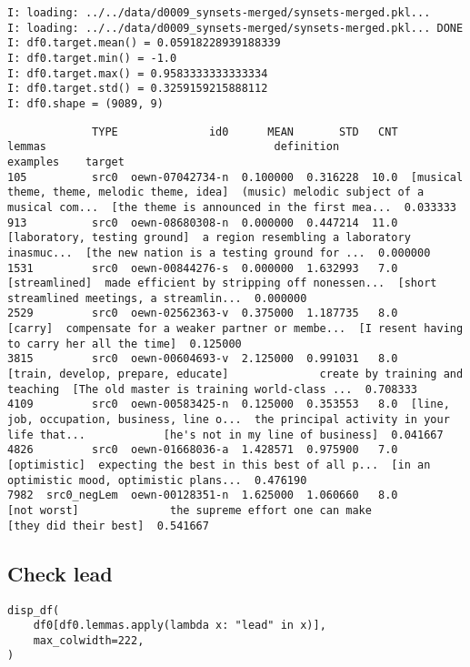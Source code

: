 \documentclass[a4paper,10pt,onecolumn,oneside,openright]{article}
\begin{document}
\begin{verbatim}
I: loading: ../../data/d0009_synsets-merged/synsets-merged.pkl...
I: loading: ../../data/d0009_synsets-merged/synsets-merged.pkl... DONE
I: df0.target.mean() = 0.05918228939188339
I: df0.target.min() = -1.0
I: df0.target.max() = 0.9583333333333334
I: df0.target.std() = 0.3259159215888112
I: df0.shape = (9089, 9)
\end{verbatim}
\begin{verbatim}
             TYPE              id0      MEAN       STD   CNT                                       lemmas                                   definition                                     examples    target
105          src0  oewn-07042734-n  0.100000  0.316228  10.0  [musical theme, theme, melodic theme, idea]  (music) melodic subject of a musical com...  [the theme is announced in the first mea...  0.033333
913          src0  oewn-08680308-n  0.000000  0.447214  11.0                 [laboratory, testing ground]  a region resembling a laboratory inasmuc...  [the new nation is a testing ground for ...  0.000000
1531         src0  oewn-00844276-s  0.000000  1.632993   7.0                                [streamlined]  made efficient by stripping off nonessen...  [short streamlined meetings, a streamlin...  0.000000
2529         src0  oewn-02562363-v  0.375000  1.187735   8.0                                      [carry]  compensate for a weaker partner or membe...  [I resent having to carry her all the time]  0.125000
3815         src0  oewn-00604693-v  2.125000  0.991031   8.0           [train, develop, prepare, educate]              create by training and teaching  [The old master is training world-class ...  0.708333
4109         src0  oewn-00583425-n  0.125000  0.353553   8.0  [line, job, occupation, business, line o...  the principal activity in your life that...            [he's not in my line of business]  0.041667
4826         src0  oewn-01668036-a  1.428571  0.975900   7.0                                 [optimistic]  expecting the best in this best of all p...  [in an optimistic mood, optimistic plans...  0.476190
7982  src0_negLem  oewn-00128351-n  1.625000  1.060660   8.0                                  [not worst]              the supreme effort one can make                        [they did their best]  0.541667
\end{verbatim}
\subsection{Check lead}
\label{sec:org875ddba}
\begin{verbatim}
disp_df(
    df0[df0.lemmas.apply(lambda x: "lead" in x)],
    max_colwidth=222,
)
\end{verbatim}
\end{document}
